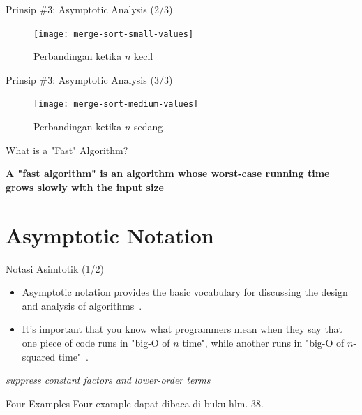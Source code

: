\documentclass[pdf]{beamer}
\theoremstyle{mystyle}
\begin{document}
\begin{frame}{Prinsip \#3: Asymptotic Analysis (2/3)}
	\begin{figure}[!ht]
		\centering
		\texttt{[image: merge-sort-small-values]}
		\caption{Perbandingan ketika $n$ kecil}
	\end{figure}
\end{frame}

\begin{frame}{Prinsip \#3: Asymptotic Analysis (3/3)}
	\begin{figure}[!ht]
		\centering
		\texttt{[image: merge-sort-medium-values]}
		\caption{Perbandingan ketika $n$ sedang}
	\end{figure}
\end{frame}

\begin{frame}{What is a "Fast" Algorithm?}
	
	\begin{center}
	\noindent\textbf{A "fast algorithm" is an algorithm whose worst-case running time grows slowly with the input size}\\\citep{roughgarden2017illuminatedpart1}
	\end{center}			
\end{frame}

\section{Asymptotic Notation}
\begin{frame}{Notasi Asimtotik (1/2)}
\begin{itemize}
	\item Asymptotic notation provides the basic vocabulary for discussing the design and analysis of algorithms~\citep{roughgarden2017illuminatedpart1}. 
	\item It's important that you know what programmers mean when they say that one piece of code runs in "big-O of $n$ time", while another runs in "big-O of $n$-squared time"~\citep{roughgarden2017illuminatedpart1}. 
\end{itemize}

\bigskip

\begin{center}
	\textit{suppress constant factors and lower-order terms}
\end{center}	
\end{frame}

\begin{frame}{Four Examples}
	Four example dapat dibaca di buku \citet{roughgarden2017illuminatedpart1} hlm. 38. 
\end{frame}
\end{document}
